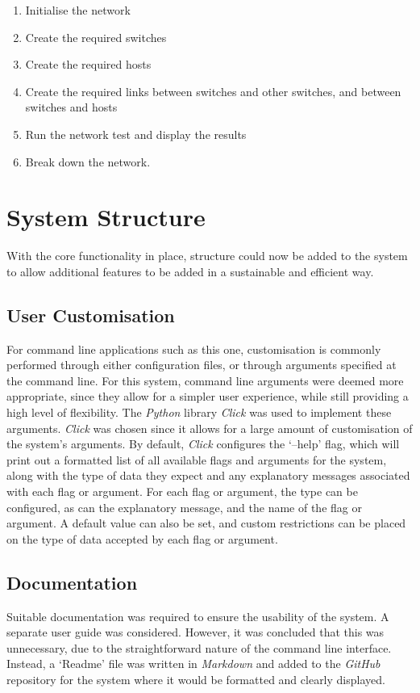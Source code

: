\begin{enumerate}
  \item Initialise the network
  \item Create the required switches
  \item Create the required hosts
  \item Create the required links between switches and other switches, and between switches and hosts
  \item Run the network test and display the results
  \item Break down the network.
\end{enumerate}

\section{System Structure}
\label{system_structure}
%

With the core functionality in place, structure could now be added to the system to allow additional features to be added in a sustainable and efficient way.

\subsection{User Customisation}
\label{user_customisation}
For command line applications such as this one, customisation is commonly performed through either configuration files, or through arguments specified at the command line.
For this system, command line arguments were deemed more appropriate, since they allow for a simpler user experience, while still providing a high level of flexibility.
The \textit{Python} library \textit{Click} \cite{python_click} was used to implement these arguments.
\textit{Click} was chosen since it allows for a large amount of customisation of the system's arguments.
By default, \textit{Click} configures the `--help' flag, which will print out a formatted list of all available flags and arguments for the system, along with the type of data they expect and any explanatory messages associated with each flag or argument.
For each flag or argument, the type can be configured, as can the explanatory message, and the name of the flag or argument.
A default value can also be set, and custom restrictions can be placed on the type of data accepted by each flag or argument.

\subsection{Documentation}
\label{documentation}
Suitable documentation was required to ensure the usability of the system.
A separate user guide was considered. However, it was concluded that this was unnecessary, due to the straightforward nature of the command line interface.
Instead, a `Readme' file was written in \textit{Markdown} \cite{markdown} and added to the \textit{GitHub} repository for the system where it would be formatted and clearly displayed.

